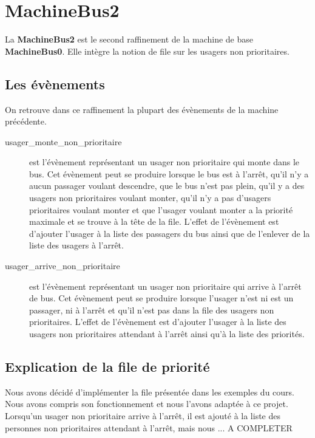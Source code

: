 \documentclass[a4paper,titlepage]{report}
\begin{document}
	
\section{MachineBus2}	
	La \textbf{MachineBus2} est le second raffinement de la machine de base \textbf{MachineBus0}. Elle intègre la notion de file sur les usagers non prioritaires.\\

	\subsection{Les évènements}
		On retrouve dans ce raffinement la plupart des évènements de la machine précédente.\\
		
		\begin{description}
			\item[usager\_monte\_non\_prioritaire] est l'évènement représentant un usager non prioritaire qui monte dans le bus.
			Cet évènement peut se produire lorsque le bus est à l'arrêt, qu'il n'y a aucun passager voulant descendre, que le bus n'est pas plein, qu'il y a des usagers non prioritaires voulant monter, qu'il n'y a pas d'usagers prioritaires voulant monter et que l'usager voulant monter a la priorité maximale et se trouve à la tête de la file.
			L'effet de l'évènement est d'ajouter l'usager à la liste des passagers du bus ainsi que de l'enlever de la liste des usagers à l'arrêt.
			
			\item[usager\_arrive\_non\_prioritaire] est l'évènement représentant un usager non prioritaire qui arrive à l'arrêt de bus.
			Cet évènement peut se produire lorsque l'usager n'est ni est un passager, ni à l'arrêt et qu'il n'est pas dans la file des usagers non prioritaires.
			L'effet de l'évènement est d'ajouter l'usager à la liste des usagers non prioritaires attendant à l'arrêt ainsi qu'à la liste des priorités.

		\end{description}
		
	\subsection{Explication de la file de priorité}
		Nous avons décidé d'implémenter la file présentée dans les exemples du cours. Nous avons compris son fonctionnement et nous l'avons adaptée à ce projet. Lorsqu'un usager non prioritaire arrive à l'arrêt, il est ajouté à la liste des personnes non prioritaires attendant à l'arrêt, mais nous ... A COMPLETER
		
\end{document}
